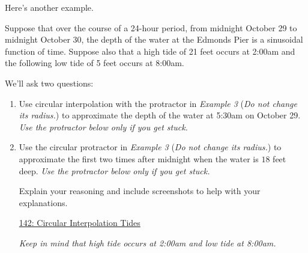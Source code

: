 \documentclass{ximera}
\begin{document}
Here's another example.


\begin{example}  \label{E888b0bbdsdsf}
Suppose that over the course of a 24-hour period, from midnight October 29 to midnight October 30, the depth of the water at the Edmonds Pier is a sinusoidal function of time. Suppose also that a high tide of 21 feet occurs at 2:00am and the following low tide of 5 feet occurs at 8:00am. 

We'll ask two questions:

\begin{enumerate}
\item Use circular interpolation with the protractor in \emph{Example 3} (\emph{Do not change its radius.}) to approximate the depth of the water at 5:30am on October 29. \emph{Use the protractor below only if you get stuck.}

\item Use the circular protractor  in \emph{Example 3} (\emph{Do not change its radius.}) to approximate the first two times after midnight when the water is $18$ feet deep.  \emph{Use the protractor below only if you get stuck.}

Explain your reasoning and include screenshots to help with your explanations.
\begin{freeResponse}
\end{freeResponse}

\begin{onlineOnly}
    \begin{center}
\end{center}
\end{onlineOnly}

\href{https://www.desmos.com/calculator/0wxwmkzvky}{142: Circular Interpolation Tides}

\emph{Keep in mind that high tide occurs at 2:00am and low tide at 8:00am.}

\end{enumerate}
\end{example}
\end{document}
